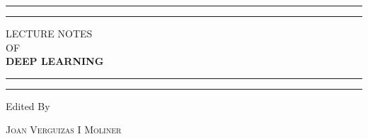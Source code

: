 \begin{titlepage} %

	\centering %
	
	\scshape %
	
	\vspace*{\baselineskip} %
	
	
	\rule{\textwidth}{1.6pt}\vspace*{-\baselineskip}\vspace*{2pt} %
	\rule{\textwidth}{0.4pt} %
	
	\vspace{0.75\baselineskip} %
	
	{\large LECTURE NOTES\\ OF\\ \LARGE \textbf{DEEP LEARNING}\\} %
	
	\vspace{0.75\baselineskip} %
	
	\rule{\textwidth}{0.4pt}\vspace*{-\baselineskip}\vspace{3.2pt} %
	\rule{\textwidth}{1.6pt} %
	
	\vspace{5\baselineskip} %
	
	
	
	
	Edited By
	
	\vspace{0.5\baselineskip} %
	
	{\scshape\Large Joan Verguizas I Moliner \\} %
	
	\vspace{0.5\baselineskip} %
	

\end{titlepage}
